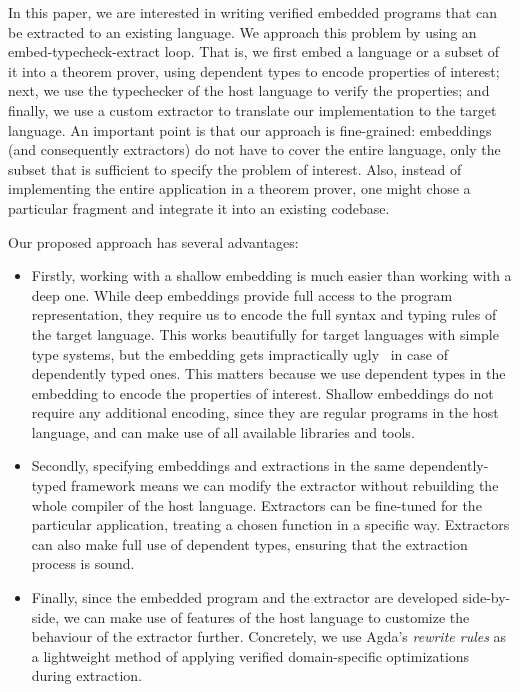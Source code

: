 \documentclass[acmsmall,review,anonymous]{acmart}\settopmatter{printfolios=true,printccs=false,printacmref=false}
\begin{document}
In this paper, we are interested in writing verified embedded programs
that can be extracted to an existing language.  We approach this problem by
using an embed-typecheck-extract loop.  That is, we first embed a
language or a subset of it into a theorem prover, using dependent
types to encode properties of interest; next, we use the typechecker of
the host language to verify the properties; and finally, we use a
custom extractor to translate our implementation to the target
language.
%
An important point is that our approach is fine-grained: embeddings
(and consequently extractors) do not have to cover the entire
language, only the subset that is sufficient to specify the problem of
interest.  Also, instead of implementing the entire application in a
theorem prover, one might chose a particular fragment and integrate it
into an existing codebase.

Our proposed approach has several advantages:
\begin{itemize}
  \item Firstly, working with a shallow embedding is much easier than
  working with a deep one.  While deep embeddings provide full access
  to the program representation, they require us to encode the full
  syntax and typing rules of the target language.
  This works beautifully for target languages with simple
  type systems, but the embedding gets impractically 
  ugly~\cite{10.1145/1863495.1863497} in
  case of dependently typed ones.  This matters because we use
  dependent types in the embedding to encode the properties of
  interest.  Shallow embeddings do not require any additional
  encoding, since they are regular programs in the host language, and
  can make use of all available libraries and tools.

  \item Secondly, specifying embeddings and extractions in the same
  dependently-typed framework means we can modify the extractor
  without rebuilding the whole compiler of the host language.
  Extractors can be fine-tuned for the particular application, \eg{}
  treating a chosen function in a specific way.  Extractors can also make
  full use of dependent types, ensuring that the extraction process is
  sound.

  \item Finally, since the embedded program and the extractor are
  developed side-by-side, we can make use of features of the host
  language to customize the behaviour of the extractor
  further. Concretely, we use Agda's \emph{rewrite rules} as a
  lightweight method of applying verified domain-specific
  optimizations during extraction.
\end{itemize}
\end{document}
